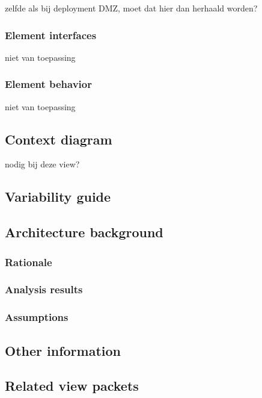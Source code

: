 \documentclass[a4paper,10pt]{paper}
\begin{document}
zelfde als bij deployment DMZ, moet dat hier dan herhaald worden?

\subsubsection{Element interfaces}

niet van toepassing

\subsubsection{Element behavior}

niet van toepassing

\subsection{Context diagram}

nodig bij deze view?

\subsection{Variability guide}

\subsection{Architecture background}

\subsubsection{Rationale}



\subsubsection{Analysis results}

\subsubsection{Assumptions}

\subsection{Other information}

\subsection{Related view packets}
\end{document}
